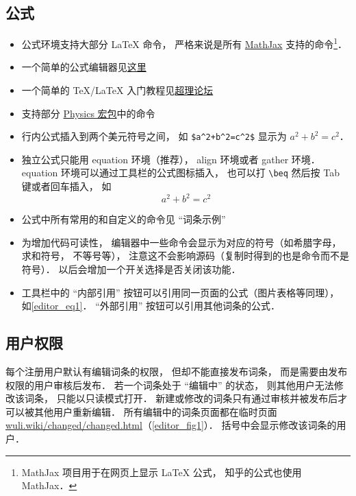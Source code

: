 \subsection{公式}
\begin{itemize}
\item 公式环境支持大部分 LaTeX 命令， 严格来说是所有 \href{https://www.mathjax.org/}{MathJax} 支持的命令\footnote{MathJax 项目用于在网页上显示 LaTeX 公式， 知乎的公式也使用 MathJax．}．
\item 一个简单的公式编辑器见\href{https://www.codecogs.com/latex/eqneditor.php}{这里}
\item 一个简单的 TeX/LaTeX 入门教程见\href{https://chaoli.club/index.php/211}{超理论坛}
\item 支持部分 \href{http://mirrors.ibiblio.org/CTAN/macros/latex/contrib/physics/physics.pdf}{Physics 宏包}中的命令
\item 行内公式插入到两个美元符号之间， 如 \lstinline|$a^2+b^2=c^2$| 显示为 $a^2 + b^2 = c^2$．
\item 独立公式只能用 equation 环境（推荐）， align 环境或者 gather 环境． equation 环境可以通过工具栏的公式图标插入， 也可以打 \lstinline|\beq| 然后按 Tab 键或者回车插入， 如
\begin{equation}\label{editor_eq1}
a^2 + b^2 = c^2
\end{equation}
\item 公式中所有常用的和自定义的命令见 “词条示例”
\item 为增加代码可读性， 编辑器中一些命令会显示为对应的符号（如希腊字母， 求和符号， 不等号等）， 注意这不会影响源码（复制时得到的也是命令而不是符号）． 以后会增加一个开关选择是否关闭该功能．
\item 工具栏中的 “内部引用” 按钮可以引用同一页面的公式（图片表格等同理）， 如\autoref{editor_eq1}． “外部引用” 按钮可以引用其他词条的公式．
\end{itemize}

\subsection{用户权限}
每个注册用户默认有编辑词条的权限， 但却不能直接发布词条， 而是需要由发布权限的用户审核后发布． 若一个词条处于 “编辑中” 的状态， 则其他用户无法修改该词条， 只能以只读模式打开． 新建或修改的词条只有通过审核并被发布后才可以被其他用户重新编辑． 所有编辑中的词条页面都在临时页面 \href{http://wuli.wiki/changed/changed.html}{wuli.wiki/changed/changed.html}（\autoref{editor_fig1}）． 括号中会显示修改该词条的用户．

